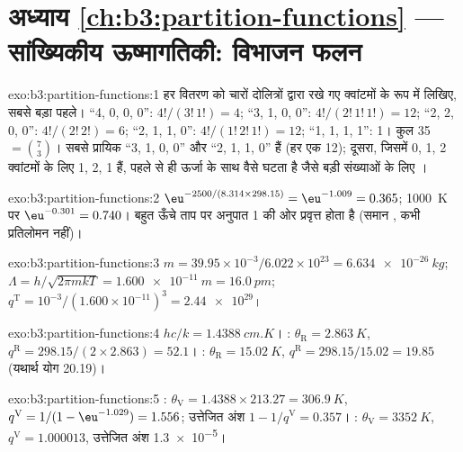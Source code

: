\section*{अध्याय \ref{ch:b3:partition-functions} --- सांख्यिकीय ऊष्मागतिकी: विभाजन फलन}

\begin{solution}{exo:b3:partition-functions:1}
हर वितरण को चारों दोलित्रों द्वारा रखे गए क्वांटमों के रूप में लिखिए, सबसे बड़ा
पहले। ``4, 0, 0, 0'': $4!/(3!\,1!) = 4$; ``3, 1, 0, 0'': $4!/(2!\,1!\,1!) = 12$; ``2, 2, 0, 0'':
$4!/(2!\,2!) = 6$; ``2, 1, 1, 0'': $4!/(1!\,2!\,1!) = 12$; ``1, 1, 1, 1'': 1। कुल 35 $= \binom73$।
सबसे प्रायिक ``3, 1, 0, 0'' और ``2, 1, 1, 0'' हैं (हर एक 12); दूसरा, जिसमें
0, 1, 2 क्वांटमों के लिए  1, 2, 1 हैं, पहले से ही ऊर्जा के साथ वैसे घटता है जैसे
बड़ी संख्याओं के लिए ।
\end{solution}

\begin{solution}{exo:b3:partition-functions:2}
$\eu^{-2500/(8.314 \times 298.15)} = \eu^{-1.009} = 0.365$; \qty{1000}{K} पर $\eu^{-0.301} = 0.740$। बहुत ऊँचे
ताप पर अनुपात 1 की ओर प्रवृत्त होता है (समान , कभी प्रतिलोमन नहीं)।
\end{solution}

\begin{solution}{exo:b3:partition-functions:3}
$m = 39.95\times10^{-3}/6.022\times10^{23} = \qty{6.634e-26}{kg}$; $\Lambda = h/\sqrt{2\pi mkT} =
\qty{1.600e-11}{m} = \qty{16.0}{pm}$; $q^{\mathrm T} = 10^{-3}/(1.600\times10^{-11})^3 = \num{2.44e29}$।
\end{solution}

\begin{solution}{exo:b3:partition-functions:4}
$hc/k = \qty{1.4388}{cm.K}$। : $\theta_{\mathrm R} = \qty{2.863}{K}$, $q^{\mathrm R} = 298.15/(2 \times 2.863) = 52.1$।
: $\theta_{\mathrm R} = \qty{15.02}{K}$, $q^{\mathrm R} = 298.15/15.02 = 19.85$ (यथार्थ योग 20.19)।
\end{solution}

\begin{solution}{exo:b3:partition-functions:5}
: $\theta_{\mathrm V} = 1.4388 \times 213.27 = \qty{306.9}{K}$, $q^{\mathrm V} = 1/(1 - \eu^{-1.029}) = 1.556$;
उत्तेजित अंश $1 - 1/q^{\mathrm V} = 0.357$। : $\theta_{\mathrm V} = \qty{3352}{K}$, $q^{\mathrm V} = 1.000013$,
उत्तेजित अंश \num{1.3e-5}।
\end{solution}


